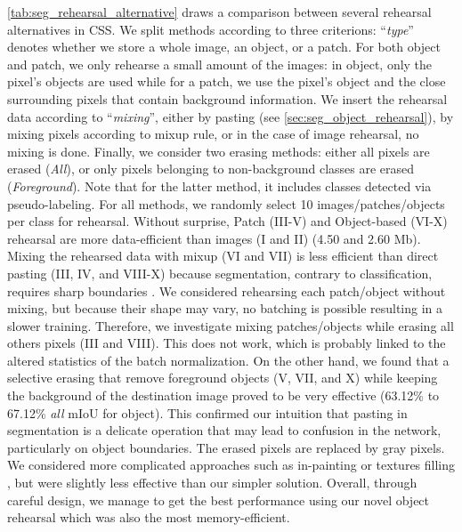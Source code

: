 \autoref{tab:seg_rehearsal_alternative} draws a comparison between several rehearsal alternatives in
\ac{CSS}. We split methods according to three criterions: ``\textit{type}'' denotes whether we store a
whole image, an object, or a patch. For both object and patch, we only rehearse a small amount of the
images: in object, only the pixel's objects are used while for a patch, we use the pixel's object and
the close surrounding pixels that contain background information. We insert the rehearsal data
according to ``\textit{mixing}'', either by pasting (see \autoref{sec:seg_object_rehearsal}), by
mixing pixels according to mixup \citep{hingyi2018mixup} rule, or in the case of image rehearsal, no
mixing is done. Finally, we consider two erasing methods: either all pixels are erased
(\textit{All}), or only pixels belonging to non-background classes are erased (\textit{Foreground}).
Note that for the latter method, it includes classes detected via pseudo-labeling. For all methods,
we randomly select 10 images/patches/objects per class for rehearsal. Without surprise, Patch
(III-V) and Object-based (VI-X) rehearsal are more data-efficient than images (I and II) (4.50 and
2.60  Mb). Mixing the rehearsed data with mixup (VI and VII) is less efficient than direct
pasting (III, IV, and VIII-X) because segmentation, contrary to classification, requires sharp
boundaries \citep{chen2020semeda}. We considered rehearsing each patch/object without mixing, but
because their shape may vary, no batching is possible resulting in a slower training. Therefore, we
investigate mixing patches/objects while erasing all others pixels (III and VIII). This does not
work, which is probably linked to the altered statistics of the batch normalization. On the other
hand, we found that a selective erasing that remove foreground objects (V, VII, and X) while keeping
the background of the destination image proved to be very effective (63.12\% to 67.12\% \textit{all}
\ac{mIoU} for object). This confirmed our intuition that pasting in segmentation is a delicate
operation that may lead to confusion in the network, particularly on object boundaries. The erased
pixels are replaced by gray pixels. We considered more complicated approaches such as in-painting
\citep{fang2019instaboost} or textures filling \citep{mallikarjuna2006kth-tips}, but were slightly
less effective than our simpler solution. Overall, through careful design, we manage to get the best
performance using our novel object rehearsal which was also the most memory-efficient.

